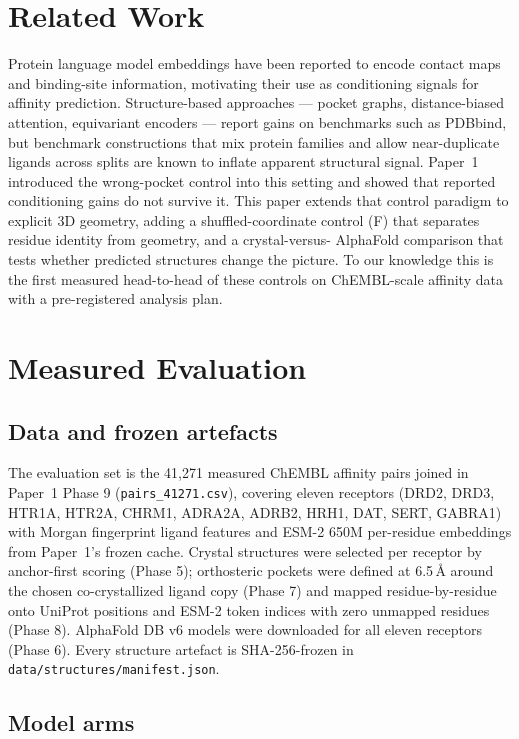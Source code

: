 \documentclass[11pt]{article}
\begin{document}
\section{Related Work}

Protein language model embeddings have been reported to encode contact
maps and binding-site information, motivating their use as conditioning
signals for affinity prediction. Structure-based approaches --- pocket
graphs, distance-biased attention, equivariant encoders --- report gains
on benchmarks such as PDBbind, but benchmark constructions that mix
protein families and allow near-duplicate ligands across splits are known
to inflate apparent structural signal. Paper~1 introduced the
wrong-pocket control into this setting and showed that reported
conditioning gains do not survive it. This paper extends that control
paradigm to explicit 3D geometry, adding a shuffled-coordinate control
(F) that separates residue identity from geometry, and a crystal-versus-
AlphaFold comparison that tests whether predicted structures change the
picture. To our knowledge this is the first measured head-to-head of
these controls on ChEMBL-scale affinity data with a pre-registered
analysis plan.

\section{Measured Evaluation}

\subsection{Data and frozen artefacts}

The evaluation set is the 41{,}271 measured ChEMBL affinity pairs joined
in Paper~1 Phase 9 (\texttt{pairs\_41271.csv}), covering eleven receptors
(DRD2, DRD3, HTR1A, HTR2A, CHRM1, ADRA2A, ADRB2, HRH1, DAT, SERT, GABRA1)
with Morgan fingerprint ligand features and ESM-2 650M per-residue
embeddings from Paper~1's frozen cache. Crystal structures were selected
per receptor by anchor-first scoring (Phase 5); orthosteric pockets were
defined at 6.5\,\AA{} around the chosen co-crystallized ligand copy
(Phase 7) and mapped residue-by-residue onto UniProt positions and ESM-2
token indices with zero unmapped residues (Phase 8). AlphaFold DB v6
models were downloaded for all eleven receptors (Phase 6). Every
structure artefact is SHA-256-frozen in
\texttt{data/structures/manifest.json}.

\subsection{Model arms}
\end{document}
